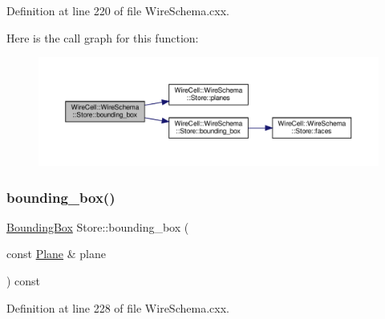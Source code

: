 Definition at line 220 of file Wire\+Schema.\+cxx.

Here is the call graph for this function\+:
\nopagebreak
\begin{figure}[H]
\begin{center}
\leavevmode
\includegraphics[width=350pt]{class_wire_cell_1_1_wire_schema_1_1_store_acf8cba891cf3ac52d76bcb4d3c59027d_cgraph}
\end{center}
\end{figure}
\mbox{\label{class_wire_cell_1_1_wire_schema_1_1_store_a518ea3cec1822b41022594933ccd31b2}} 
\subsubsection{\texorpdfstring{bounding\+\_\+box()}{bounding\_box()}\hspace{0.1cm}{\footnotesize\ttfamily [3/3]}}
{\footnotesize\ttfamily \hyperlink{class_wire_cell_1_1_bounding_box}{Bounding\+Box} Store\+::bounding\+\_\+box (\begin{DoxyParamCaption}\item[{const \hyperlink{struct_wire_cell_1_1_wire_schema_1_1_plane}{Plane} \&}]{plane }\end{DoxyParamCaption}) const}



Definition at line 228 of file Wire\+Schema.\+cxx.

